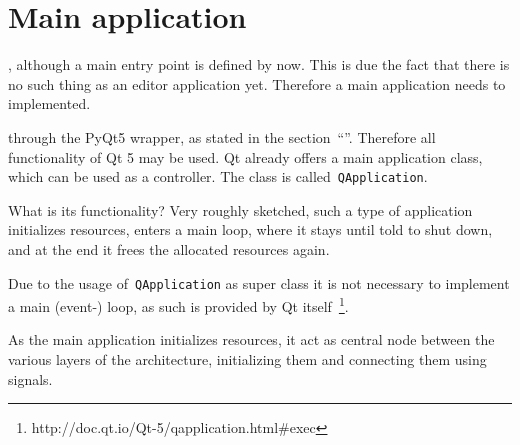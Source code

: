 \documentclass[%
    a4paper,    %
    justified,  %
    nobib,      %
    openany     %
]{tufte-book}
\begin{document}
\section{Main application}
\label{appendix:sec:editor:app}

, although a main entry
point is defined by now. This is due the fact that there is no such thing as an
editor application yet. Therefore a main application needs to implemented.

 through the PyQt5 wrapper, as stated in the
section~\enquote{}. Therefore all
functionality of Qt 5 may be used. Qt already offers a main application class,
which can be used as a controller. The class is called~\verb=QApplication=.

 What is
its functionality? Very roughly sketched, such a type of application initializes
resources, enters a main loop, where it stays until told to shut down, and at
the end it frees the allocated resources again.

Due to the usage of~\verb=QApplication= as super class it is not necessary to
implement a main (event-) loop, as such is provided by Qt
itself~\footnote{http://doc.qt.io/Qt-5/qapplication.html\#exec}.

As the main application initializes resources, it act as central node between the
various layers of the architecture, initializing them and connecting them using
signals.\cite[pp. 37 --- 38]{osterwalder-qde-2016}
\end{document}
